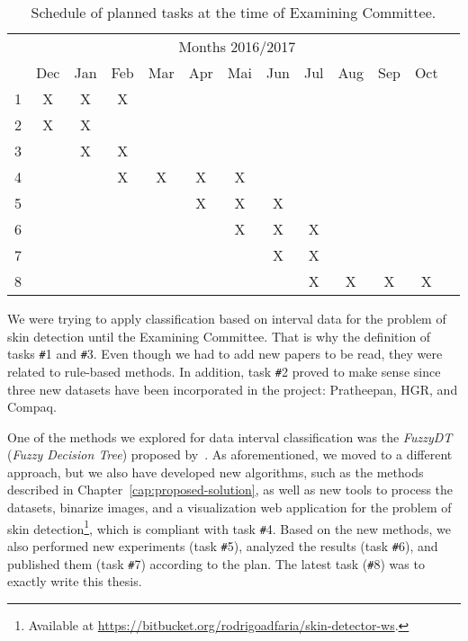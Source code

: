 \begin{table}[!htpb]
\centering

\setlength{\tabcolsep}{6pt} 

\begin{tabular}{|c|c|c|c|c|c|c|c|c|c|c|c|c|}\hline
 & \multicolumn{11}{c|}{Months 2016/2017}\\ \cline{2-12}
\raisebox{1.5ex}{Task} & Dec & Jan & Feb & Mar & Apr & Mai & Jun & Jul & Aug & Sep & Oct \\ \hline

1 & X & X & X &   &   &   &   &   &   &   & \\ \hline
2 & X & X &   &   &   &   &   &   &   &   & \\ \hline
3 &   & X & X &   &   &   &   &   &   &   & \\ \hline
4 &   &   & X & X & X & X &   &   &   &   & \\ \hline
5 &   &   &   &   & X & X & X &   &   &   & \\ \hline
6 &   &   &   &   &   & X & X & X &   &   & \\ \hline
7 &   &   &   &   &   &   & X & X &   &   & \\ \hline
8 &   &   &   &   &   &   &   & X & X & X & X \\ \hline

\end{tabular} 
\caption{Schedule of planned tasks at the time of Examining Committee.}
\label{tab:schedule}
\end{table}

We were trying to apply classification based on interval data for the problem of skin detection until the Examining Committee. That is why the definition of tasks \texttt{\#}1 and \texttt{\#}3. Even though we had to add new papers to be read, they were related to rule-based methods. In addition, task \texttt{\#}2 proved to make sense since three new datasets have been incorporated in the project: Pratheepan, HGR, and Compaq.

One of the methods we explored for data interval classification was the \emph{FuzzyDT} (\emph{Fuzzy Decision Tree}) proposed by~\citet{cintra:13}. As aforementioned, we moved to a different approach, but we also have developed new algorithms, such as the methods described in Chapter~\ref{cap:proposed-solution}, as well as new tools to process the datasets, binarize images, and a visualization web application for the problem of skin detection\footnote{Available at \url{https://bitbucket.org/rodrigoadfaria/skin-detector-ws}.}, which is compliant with task \texttt{\#}4. Based on the new methods, we also performed new experiments (task \texttt{\#}5), analyzed the results (task \texttt{\#}6), and published them (task \texttt{\#}7) according to the plan. The latest task (\texttt{\#}8) was to exactly write this thesis.

